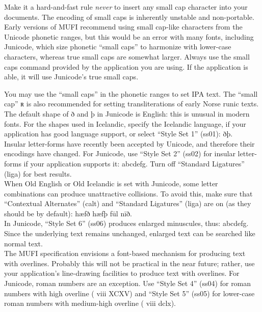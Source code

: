 \documentclass[a4paper]{article}
\begin{document}
Make it a hard-and-fast rule {\itshape never} to insert any small cap character
into your documents. The encoding of small caps is inherently unstable and
non-portable. Early versions of MUFI recommend using small cap-like characters from the
Unicode phonetic ranges, but this would be an error with many fonts, including
Junicode, which size phonetic “small caps” to harmonize with lower-case
characters, whereas true small caps are somewhat larger. Always use the
small caps command provided by the application you are using. If the
application is able, it will use Junicode’s true small caps.

You may use the “small caps” in the phonetic ranges to set IPA text. The
“small cap” ʀ is also recommended for setting transliterations of early Norse
runic texts.\\

The default shape of ð and þ in Junicode is English: this is unusual in
modern fonts. For the shapes used in Icelandic, specify the Icelandic
language, if your application has good language support, or select
“Style Set 1” (ss01): { ðþ}.\\

  Insular letter-forms have
recently been accepted by Unicode, and therefore their encodings have
changed. For Junicode, use “Style Set 2” (ss02) for insular
letter-forms if your application supports it:
{ abcdefg.} Turn off “Standard
Ligatures” (liga) for best results.\\

  When
Old English or Old Icelandic is set with Junicode, some letter
combinations can produce unattractive collisions. To avoid this, make
sure that “Contextual Alternates” (calt) and “Standard Ligatures”
(liga) are on (as they should be by default): hæfð hæfþ fūl nīð.\\

  In Junicode, “Style Set 6”
(ss06) produces enlarged minuscules, thus:
{ abcdefg.} Since the underlying
text remains unchanged, enlarged text can be searched like normal
text.\\

  The MUFI specification
envisions a font-based mechanism for producing text with
overlines. Probably this will not be practical in the near future;
rather, use your application’s line-drawing facilities to produce text
with overlines. For Junicode, roman numbers are an exception. Use
“Style Set 4” (ss04) for roman numbers with high overline
({ viii XCXV}) and “Style Set 5”
(ss05) for lower-case roman numbers with medium-high overline
({ viii dclx}).\\
\end{document}
